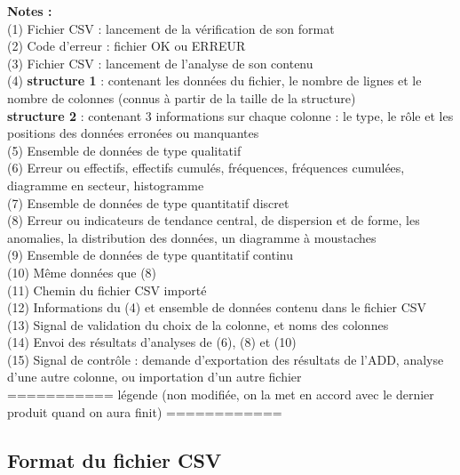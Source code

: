 			\textbf{Notes :}\\
				(1) Fichier CSV : lancement de la vérification de son format\\
				(2) Code d'erreur : fichier OK ou ERREUR\\
				(3) Fichier CSV : lancement de l'analyse de son contenu\\
				(4) \textbf{structure 1} : contenant les données du fichier, le nombre de lignes et le nombre de colonnes (connus à partir de la taille de la structure)\\
				\hspace*{1.5em} \textbf{structure 2} : contenant 3 informations sur chaque colonne : le type, le rôle et les positions des données erronées ou manquantes\\
				(5) Ensemble de données de type qualitatif\\
				(6) Erreur ou effectifs, effectifs cumulés, fréquences, fréquences cumulées, diagramme en secteur, histogramme\\
				(7) Ensemble de données de type quantitatif discret\\
				(8) Erreur ou indicateurs de tendance central, de dispersion et de forme, les anomalies, la distribution des données, un diagramme à moustaches\\
				(9) Ensemble de données de type quantitatif continu\\
				(10) Même données que (8)\\
				(11) Chemin du fichier CSV importé \\
				(12) Informations du (4) et ensemble de données contenu dans le fichier CSV \\
				(13) Signal de validation du choix de la colonne, et noms des colonnes\\
				(14) Envoi des résultats d'analyses de (6), (8) et (10)\\
				(15) Signal de contrôle : demande d'exportation des résultats de l'ADD, analyse d'une autre colonne, ou importation d'un autre fichier\\
			
			
			
			 =========== légende (non modifiée, on la met en accord avec le dernier produit quand on aura finit) ============
			
		\subsection{Format du fichier CSV}
			
